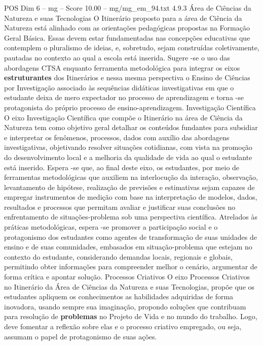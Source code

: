 \begin{textsample}{POS Dim 6 – mg – Score 10.00 – mg/mg\_em\_94.txt}  \label{ex:f6_pos_243}
4.9.3 Área de Ciências da Natureza e suas Tecnologias O Itinerário proposto para a área de Ciência da Natureza está alinhado com as orientações pedagógicas propostas na Formação Geral Básica.
Essas devem estar fundamentadas nas concepções educativas que contemplem o pluralismo de ideias, e, sobretudo, sejam construídas coletivamente, pautadas no contexto ao qual a escola está inserida.
Sugere -se o uso das abordagens CTSA enquanto ferramenta metodológica para integrar os eixos \textbf{estruturantes} dos Itinerários e nessa mesma perspectiva o Ensino de Ciências por Investigação associado às sequências didáticas investigativas em que o estudante deixa de mero expectador no processo de aprendizagem e torna -se protagonista do próprio processo de ensino-aprendizagem.
Investigação Científica O eixo Investigação Científica que compõe o Itinerário na área de Ciência da Natureza tem como objetivo geral detalhar os conteúdos fundantes para subsidiar e interpretar os fenômenos, processos, dados com auxílio das abordagens investigativas, objetivando resolver situações cotidianas, com vista na promoção do desenvolvimento local e a melhoria da qualidade de vida ao qual o estudante está inserido.
Espera -se que, ao final deste eixo, os estudantes, por meio de ferramentas metodológicas que auxiliem na interlocução da interação, observação, levantamento de hipótese, realização de previsões e estimativas sejam capazes de empregar instrumentos de medição com base na interpretação de modelos, dados, resultados e processos que permitam avaliar e justificar suas conclusões no enfrentamento de situações-problema sob uma perspectiva científica.
Atrelados às práticas metodológicas, espera -se promover a participação social e o protagonismo dos estudantes como agentes de transformação de suas unidades de ensino e de suas comunidades, embasados em situação-problema que estejam no contexto do estudante, considerando demandas locais, regionais e globais, permitindo obter informações para compreender melhor o cenário, argumentar de forma crítica e apontar solução.
Processos Criativos O eixo Processos Criativos no Itinerário da Área de Ciências da Natureza e suas Tecnologias, propõe que os estudantes apliquem os conhecimentos as habilidades adquiridas de forma inovadora, usando sempre sua imaginação, propondo soluções que contribuam para resolução de \textbf{problemas} no Projeto de Vida e no mundo do trabalho.
Logo, deve fomentar a reflexão sobre elas e o processo criativo empregado, ou seja, assumam o papel de protagonismo de suas ações.

\end{textsample}
